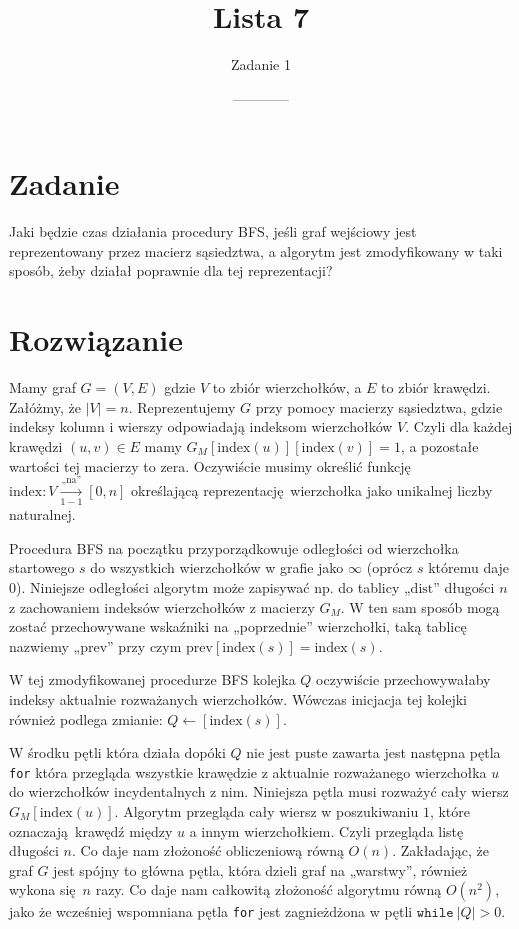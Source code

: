 \documentclass[14pt]{article}
\title{Lista 7}
\author{Zadanie 1}
\date{------------}
\begin{document}
\maketitle

\section{Zadanie}

Jaki będzie czas działania procedury BFS, jeśli graf wejściowy jest reprezentowany przez macierz sąsiedztwa, a algorytm jest zmodyfikowany w taki sposób, żeby działał poprawnie dla tej reprezentacji?

\section{Rozwiązanie}

Mamy graf $G = (V,E)$ gdzie $V$ to zbiór wierzchołków, a $E$ to zbiór krawędzi. Załóżmy, że $|V| = n$. Reprezentujemy $G$ przy pomocy macierzy sąsiedztwa, gdzie indeksy kolumn i wierszy odpowiadają indeksom wierzchołków $V$. Czyli dla każdej krawędzi $(u,v) \in E$ mamy $G_M[\mathrm{index}(u)][\mathrm{index}(v)] = 1$, a pozostałe wartości tej macierzy to zera. Oczywiście musimy określić funkcję $\mathrm{index}: V \xrightarrow[1-1]{\text{„na”}} [0, n]$ określającą reprezentację wierzchołka jako unikalnej liczby naturalnej.

Procedura BFS na początku przyporządkowuje odległości od wierzchołka startowego $s$ do wszystkich wierzchołków w grafie jako $\infty$ (oprócz $s$ któremu daje $0$). Niniejsze odległości algorytm może zapisywać np. do tablicy „$\mathrm{dist}$” długości $n$ z zachowaniem indeksów wierzchołków z macierzy $G_M$. W ten sam sposób mogą zostać przechowywane wskaźniki na „poprzednie” wierzchołki, taką tablicę nazwiemy „$\mathrm{prev}$” przy czym $\mathrm{prev}[\mathrm{index}(s)] = \mathrm{index}(s)$.

W tej zmodyfikowanej procedurze BFS kolejka $Q$ oczywiście przechowywałaby indeksy aktualnie rozważanych wierzchołków. Wówczas inicjacja tej kolejki również podlega zmianie: $Q \gets [\mathrm{index}(s)]$.

W środku pętli która działa dopóki $Q$ nie jest puste zawarta jest następna pętla \texttt{for} która przegląda wszystkie krawędzie z aktualnie rozważanego wierzchołka $u$ do wierzchołków incydentalnych z nim. Niniejsza pętla musi rozważyć cały wiersz $G_M[\mathrm{index}(u)]$. Algorytm przegląda cały wiersz w poszukiwaniu $1$, które oznaczają krawędź między $u$ a innym wierzchołkiem. Czyli przegląda listę długości $n$. Co daje nam złożoność obliczeniową równą $O(n)$. Zakładając, że graf $G$ jest spójny to główna pętla, która dzieli graf na „warstwy”, również wykona się $n$ razy. Co daje nam całkowitą złożoność algorytmu równą $O(n^2)$, jako że wcześniej wspomniana pętla \texttt{for} jest zagnieżdżona w pętli $\texttt{while}~ |Q| > 0$.
\end{document}
